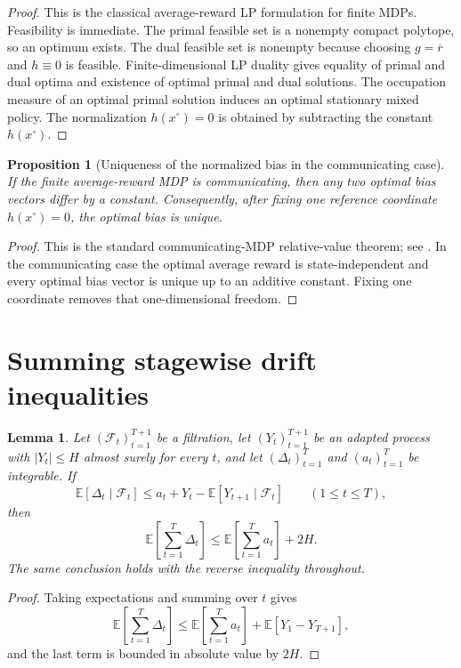 \documentclass[12pt]{article}
\newtheorem{proposition}[theorem]{Proposition}
\newtheorem{lemma}[theorem]{Lemma}
\theoremstyle{definition}
\newcommand{\E}{\mathbb{E}}
\newcommand{\1}{\mathbf{1}}
\newcommand{\cF}{\mathcal{F}}
\begin{document}
\begin{proof}
This is the classical average-reward LP formulation for finite MDPs. Feasibility is
immediate. The primal feasible set is a nonempty compact polytope, so an optimum
exists. The dual feasible set is nonempty because choosing $g=\overline r$ and
$h\equiv 0$ is feasible. Finite-dimensional LP duality gives equality of primal
and dual
optima and existence of optimal primal and dual solutions. The occupation measure
of an optimal primal solution induces an optimal stationary mixed policy. The
normalization $h(x^\circ)=0$ is obtained by subtracting the constant $h(x^\circ)$.
\end{proof}

\begin{proposition}[Uniqueness of the normalized bias in the communicating case]
\label{prop:bias-unique}
If the finite average-reward MDP is communicating, then any two optimal bias
vectors differ by a constant. Consequently, after fixing one reference coordinate
$h(x^\circ)=0$, the optimal bias is unique.
\end{proposition}

\begin{proof}
This is the standard communicating-MDP relative-value theorem; see
\cite[Chapter~8]{Puterman1994}. In the communicating case the optimal average
reward is state-independent and every optimal bias vector is unique up to an
additive constant. Fixing one coordinate removes that one-dimensional freedom.
\end{proof}




\section{Summing stagewise drift inequalities}
\label{app:aggregation}

\begin{lemma}
\label{lem:aggregation}
Let $(\cF_t)_{t=1}^{T+1}$ be a filtration, let $(Y_t)_{t=1}^{T+1}$ be an adapted
process with $|Y_t|\le H$ almost surely for every $t$, and let
$(\Delta_t)_{t=1}^T$ and $(a_t)_{t=1}^T$ be integrable. If
\[
\E[\Delta_t\mid \cF_t]
\le
a_t + Y_t - \E[Y_{t+1}\mid \cF_t]
\qquad (1\le t\le T),
\]
then
\[
\E\left[\sum_{t=1}^T \Delta_t\right]
\le
\E\left[\sum_{t=1}^T a_t\right] + 2H.
\]
The same conclusion holds with the reverse inequality throughout.
\end{lemma}

\begin{proof}
Taking expectations and summing over $t$ gives
\[
\E\left[\sum_{t=1}^T \Delta_t\right]
\le
\E\left[\sum_{t=1}^T a_t\right]
+
\E[Y_1-Y_{T+1}],
\]
and the last term is bounded in absolute value by $2H$.
\end{proof}
\end{document}
